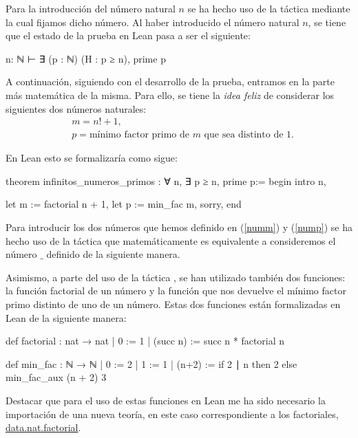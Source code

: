 Para la introducción del número natural \(n\) se ha hecho uso de la
táctica  mediante la cual fijamos dicho número. Al
haber introducido el número natural \(n\), se tiene que el estado de la
prueba en Lean pasa a ser el siguiente:
\begin{leancode}
n: ℕ
⊢ ∃ (p : ℕ) (H : p ≥ n), prime p
\end{leancode}

A continuación, siguiendo con el desarrollo de la prueba, entramos en la
parte más matemática de la misma. Para ello, se tiene la \textit{idea
feliz} de considerar los siguientes dos números naturales:
\begin{align}
  &m = n!+1,\label{numm}\\
  &p = \text{mínimo factor primo de \(m\) que sea distinto de 1}.\label{nump}
\end{align}

En Lean esto se formalizaría como sigue:
\begin{leancode}
theorem infinitos_numeros_primos : ∀ n, ∃ p ≥ n, prime p:=
begin
  intro n,

  let m := factorial n + 1,
  let p := min_fac m,
  sorry,
end
\end{leancode}

Para introducir los dos números que hemos definido en (\ref{numm}) y
(\ref{nump}) se ha hecho uso de la táctica  que
matemáticamente es equivalente a consideremos el número \(\_\) definido de la
siguiente manera.

Asimismo, a parte del uso de la táctica , se han
utilizado también dos funciones: la función factorial de un número y la
función que nos devuelve el mínimo factor primo distinto de uno de un
número. Estas dos funciones están formalizadas en Lean de la siguiente
manera:
\begin{leancode}
def factorial : nat → nat
| 0        := 1
| (succ n) := succ n * factorial n
\end{leancode}
\begin{leancode}
def min_fac : ℕ → ℕ
  | 0 := 2
  | 1 := 1
  | (n+2) := if 2 ∣ n then 2 else min_fac_aux (n + 2) 3
\end{leancode}

Destacar que para el uso de estas funciones en Lean me ha sido necesario
la importación de una nueva teoría, en este caso correspondiente a los
factoriales,
\href{https://github.com/leanprover-community/mathlib/blob/master/src/data/nat/factorial.lean}{data.nat.factorial}.

